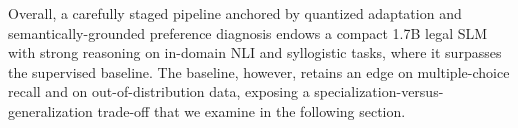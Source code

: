 Overall, a carefully staged pipeline anchored by quantized adaptation and semantically-grounded preference diagnosis endows a compact 1.7B legal SLM with strong reasoning on in-domain NLI and syllogistic tasks, where it surpasses the supervised baseline. The baseline, however, retains an edge on multiple-choice recall and on out-of-distribution data, exposing a specialization-versus-generalization trade-off that we examine in the following section.
